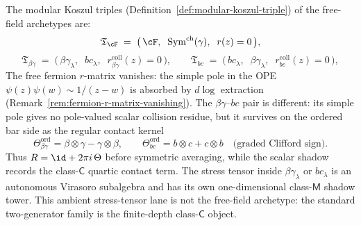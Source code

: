 The modular Koszul triples
(Definition~\ref{def:modular-koszul-triple}) of the free-field
archetypes are:
\begin{equation}\label{eq:fermion-triple}
\mathfrak{T}_{\cF}
\;=\;
\bigl(\,\cF,\;\;
\operatorname{Sym}^{\mathrm{ch}}(\gamma),\;\;
r(z) = 0\,\bigr),
\end{equation}
\begin{equation}\label{eq:betagamma-triple}
\mathfrak{T}_{\beta\gamma}
\;=\;
\bigl(\,\beta\gamma_\lambda,\;\;
bc_\lambda,\;\;
r_{\beta\gamma}^{\mathrm{coll}}(z)=0\,\bigr),
\qquad
\mathfrak{T}_{bc}
\;=\;
\bigl(\,bc_\lambda,\;\;
\beta\gamma_\lambda,\;\;
r_{bc}^{\mathrm{coll}}(z)=0\,\bigr),
\end{equation}
The free fermion $r$-matrix vanishes: the simple pole in the
OPE $\psi(z)\psi(w) \sim 1/(z{-}w)$ is absorbed by $d\log$
extraction (Remark~\ref{rem:fermion-r-matrix-vanishing}).
The $\beta\gamma$--$bc$ pair is different: its simple pole gives no
pole-valued scalar collision residue, but it survives on the
ordered bar side as the regular contact kernel
\[
\Theta_{\beta\gamma}^{\mathrm{ord}}
=\beta\otimes\gamma-\gamma\otimes\beta,
\qquad
\Theta_{bc}^{\mathrm{ord}}
=b\otimes c+c\otimes b
\quad\text{(graded Clifford sign).}
\]
Thus $R=\id+2\pi i\,\Theta$ before symmetric averaging, while
the scalar shadow records the class-$\mathsf{C}$ quartic contact
term.
The stress tensor inside $\beta\gamma_\lambda$ or $bc_\lambda$ is an
autonomous Virasoro subalgebra and has its own one-dimensional
class-$\mathsf{M}$ shadow tower. This ambient stress-tensor lane is not
the free-field archetype: the standard two-generator family is the
finite-depth class-$\mathsf{C}$ object.

